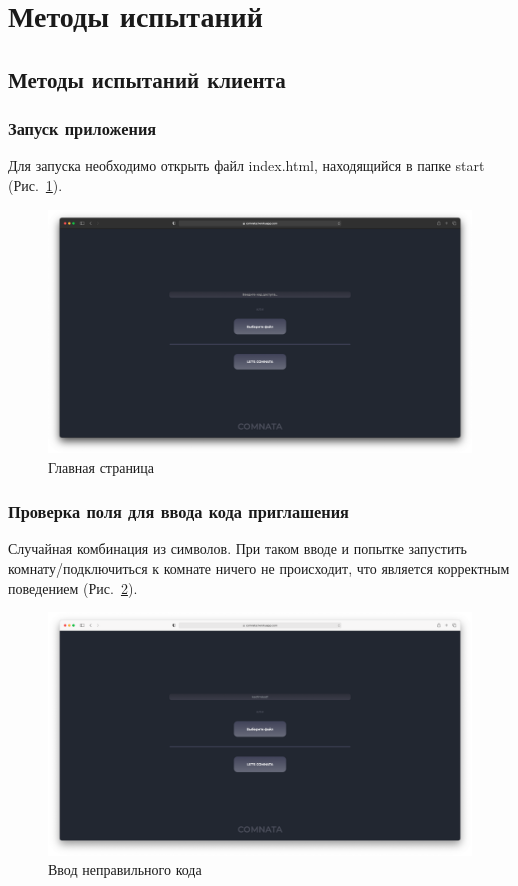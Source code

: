 \documentclass{../../includes/TechDocMultiAuthors}
\begin{document}
    \section{Методы испытаний}

    \subsection{Методы испытаний клиента}

    \subsubsection{Запуск приложения}

    Для запуска необходимо открыть файл index.html, находящийся в папке start (Рис.~\ref{fig:start_page}).

    \begin{figure}[H]
        \centering
        \includegraphics[width=0.9\linewidth]{../images/start_page.png}
        \caption{Главная страница}
        \label{fig:start_page}
    \end{figure}

    \subsubsection{Проверка поля для ввода кода приглашения}

    Случайная комбинация из символов.
    При таком вводе и попытке запустить комнату/подключиться к комнате ничего не происходит, что является корректным поведением (Рис.~\ref{fig:wrong_code}).

    \begin{figure}[H]
        \centering
        \includegraphics[width=0.9\linewidth]{../images/wrong_code.png}
        \caption{Ввод неправильного кода}
        \label{fig:wrong_code}
    \end{figure}
\end{document}
